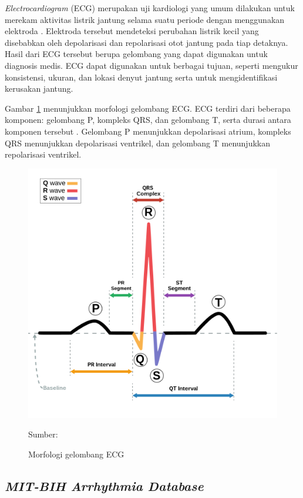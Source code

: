 \textit{Electrocardiogram} (ECG) merupakan uji kardiologi yang umum dilakukan untuk merekam aktivitas listrik jantung selama suatu periode dengan menggunakan elektroda \parencite{yoonDeepLearningbasedElectrocardiogram2019}.
Elektroda tersebut mendeteksi perubahan listrik kecil yang disebabkan oleh depolarisasi dan repolarisasi otot jantung pada tiap detaknya.
Hasil dari ECG tersebut berupa gelombang yang dapat digunakan untuk diagnosis medis.
ECG dapat digunakan untuk berbagai tujuan, seperti mengukur konsistensi, ukuran, dan lokasi denyut jantung serta untuk mengidentifikasi kerusakan jantung.


Gambar \ref{fig: ecg-morphology} menunjukkan morfologi gelombang ECG. ECG terdiri dari beberapa komponen: gelombang P, kompleks QRS, dan gelombang T, serta durasi antara komponen tersebut \parencite{anbalaganAnalysisVariousTechniques2023}.  Gelombang P menunjukkan depolarisasi atrium, kompleks QRS menunjukkan depolarisasi ventrikel, dan gelombang T menunjukkan repolarisasi ventrikel.

\begin{figure}[H]
  \centering
  \includegraphics[width=.5\linewidth]{img/ecg-morphology.png}
  \caption{Morfologi gelombang ECG}
  Sumber: \textcite{wiki:xxx}
  \label{fig: ecg-morphology}
\end{figure}

\subsection{\textit{MIT-BIH Arrhythmia Database}}
\label{subsec: landasan-mitbih}

